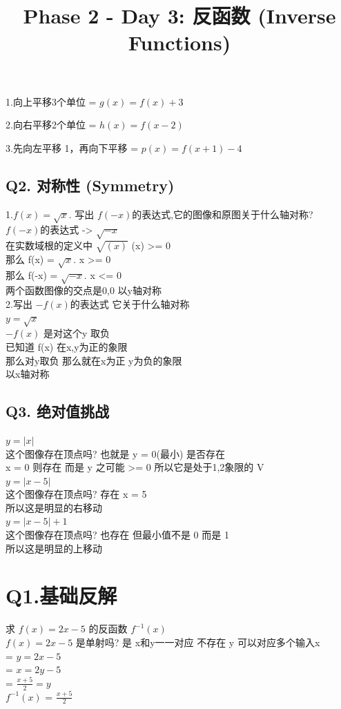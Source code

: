 \documentclass[12pt]{article}
\begin{document}
1.向上平移3个单位
= $g(x) = f(x)+3$

2.向右平移2个单位
= $h(x) = f(x-2)$

3.先向左平移 1，再向下平移 
= $p(x) = f(x + 1) - 4$


\subsection*{Q2. 对称性 (Symmetry)}

1.$f(x) = \sqrt{x}.$ 写出 $f(-x)$的表达式,它的图像和原图关于什么轴对称? \\
  $f(-x)$的表达式 ->  $\sqrt{-x}$  \\ 
在实数域根的定义中 $\sqrt{(x)}$ (x) >= 0 \\  
那么 f(x) = $\sqrt{x}.$ x >= 0 \\
那么 f(-x) = $\sqrt{-x}.$ x <= 0 \\ 
两个函数图像的交点是0,0 以y轴对称 \\ 

2.写出 $-f(x)$的表达式 它关于什么轴对称\\
   $y = \sqrt{x}$ \\
   $-f(x)$ 是对这个y 取负 \\
已知道 f(x) 在x,y为正的象限 \\
那么对y取负 那么就在x为正 y为负的象限  \\ 
以x轴对称 \\

\subsection*{Q3. 绝对值挑战}
$y = |x|$ \\
这个图像存在顶点吗? 也就是 y = 0(最小) 是否存在 \\
x = 0 则存在 而是 y 之可能 >= 0 所以它是处于1,2象限的 V \\  
$y = |x - 5|$ \\ 
这个图像存在顶点吗? 存在 x = 5 \\  
所以这是明显的右移动 \\ 

$y = |x - 5| + 1$ \\ 
这个图像存在顶点吗? 也存在 但最小值不是 0 而是 1 \\
所以这是明显的上移动 \\ 


\title{Phase 2 - Day 3: 反函数 (Inverse Functions)}

\section*{Q1.基础反解}
求 $f(x) = 2x-5$ 的反函数 $f^{-1}(x)$ \\
$f(x) = 2x-5$ 是单射吗? 是 x和y一一对应 不存在 y 可以对应多个输入x \\
= $y = 2x -5$ \\ 
= $x = 2y -5$ \\ 
= $\frac{x+5}{2} = y $ \\  
$f^{-1}(x)$ = $\frac{x+5}{2}$ \\ 
\end{document}
